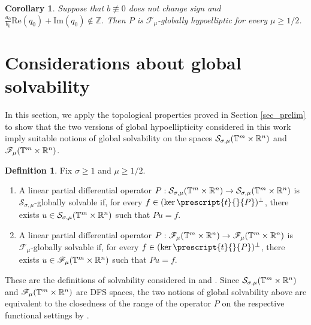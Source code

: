 \documentclass[11pt,reqno]{amsart}
\numberwithin{equation}{section}
\newtheorem{corollary}[theorem]{Corollary}
\theoremstyle{definition}
\theoremstyle{definition}
\newtheorem{definition}[theorem]{Definition}
\DeclareMathOperator{\Pt}{\mathnormal{\prescript{t}{}{P}}}
\newcommand{\G}{\mathnormal{\mathbb{T}^{m}\times\mathbb{R}^n}}
\newcommand{\Z}{\mathbb{Z}}
\newcommand{\Real}{\mathrm{Re}}
\newcommand{\Imag}{\mathrm{Im}}
\renewcommand{\S}{\mathcal{S}_{\sigma,\mu}(\G)}
\begin{document}
\begin{corollary}
    Suppose that $b\not\equiv0$ does not change sign and $\frac{a_0}{b_0}\Real(q_0)+\Imag(q_0)\not\in\Z$. Then $P$ is $\mathscr{F}_\mu$-globally hypoelliptic for every $\mu\geq 1/2$.
\end{corollary}



\section{Considerations about global solvability}

In this section, we apply the topological properties proved in Section \ref{sec_prelim} to show that the two versions of global hypoellipticity considered in this work imply suitable notions of global solvability on the spaces $\mathcal{S}_{\sigma,\mu}(\G)$ and $\mathscr{F}_\mu(\G)$. 

\begin{definition}
Fix $\sigma\geq 1$ and $\mu\geq 1/2$.
    \begin{enumerate}
        \item A linear partial differential operator $P:\S\to\S$ is $\mathcal{S}_{\sigma,\mu}$-globally solvable if, for every $f\in(\ker\Pt)^\perp$, there exists $u\in\S$ such that $Pu=f$.

        \item A linear partial differential operator $P:\mathscr{F}_\mu(\G)\to \mathscr{F}_\mu(\G)$ is $\mathscr{F}_{\mu}$-globally solvable if, for every $f\in(\ker\Pt)^\perp$, there exists $u\in\mathscr{F}_\mu(\G)$ such that $Pu=f$.
    \end{enumerate}    
\end{definition}

These are the definitions of solvability considered in \cite{AvCap2025} and \cite{AvCapKir2024}. Since $\S$ and $\mathscr{F}_\mu(\G)$ are DFS spaces, the two notions of global solvability above are equivalent to the closedness of the range of the operator $P$ on the respective functional settings by \cite[Lemma 2.2]{Araujo2017}.
\end{document}
